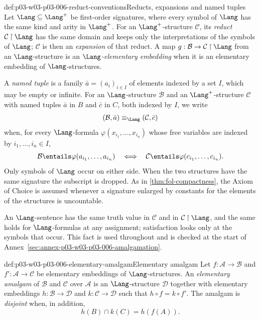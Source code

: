\begin{hbconvention}{def:p03-w03-p03-006-reduct-conventions}{Reducts, expansions and named tuples}
Let \(\Lang\subseteq\Lang^+\) be first-order signatures, where every symbol
of \(\Lang\) has the same kind and arity in \(\Lang^+\).  For an
\(\Lang^+\)-structure \(\mathcal C\), its \emph{reduct}
\(\mathcal C\mathbin{\upharpoonright}\Lang\) has the same domain and keeps
only the interpretations of the symbols of \(\Lang\); \(\mathcal C\) is then
an \emph{expansion} of that reduct.  A map
\(g:\mathcal B\to\mathcal C\mathbin{\upharpoonright}\Lang\) from an
\(\Lang\)-structure is an \emph{\(\Lang\)-elementary embedding} when it is
an elementary embedding of \(\Lang\)-structures.

A \emph{named tuple} is a family \(\bar a=(a_i)_{i\in I}\) of elements
indexed by a set \(I\), which may be empty or infinite.  For an
\(\Lang\)-structure \(\mathcal B\) and an \(\Lang^+\)-structure
\(\mathcal C\) with named tuples \(\bar a\) in \(B\) and \(\bar c\) in
\(C\), both indexed by \(I\), we write
\[
 (\mathcal B,\bar a)\equiv_{\Lang}(\mathcal C,\bar c)
\]
when, for every \(\Lang\)-formula \(\varphi(x_{i_1},\ldots,x_{i_n})\) whose
free variables are indexed by \(i_1,\ldots,i_n\in I\),
\[
 \mathcal B\entails\varphi(a_{i_1},\ldots,a_{i_n})
 \quad\Longleftrightarrow\quad
 \mathcal C\entails\varphi(c_{i_1},\ldots,c_{i_n}).
\]
Only symbols of \(\Lang\) occur on either side.  When the two structures
have the same signature the subscript is dropped.  As in
\cref{thm:fol-compactness}, the Axiom of Choice is assumed whenever a
signature enlarged by constants for the elements of the structures is
uncountable.
\end{hbconvention}

An \(\Lang\)-sentence has the same truth value in \(\mathcal C\) and in
\(\mathcal C\mathbin{\upharpoonright}\Lang\), and the same holds for
\(\Lang\)-formulas at any assignment; satisfaction looks only at the
symbols that occur.  This fact is used throughout and is checked at the
start of Annex~\ref{sec:annex-p03-w03-p03-006-amalgamation}.

\begin{hbdefinition}{def:p03-w03-p03-006-elementary-amalgam}{Elementary amalgam}
Let \(f:\mathcal A\to\mathcal B\) and \(f':\mathcal A\to\mathcal C\) be
elementary embeddings of \(\Lang\)-structures.  An \emph{elementary
amalgam} of \(\mathcal B\) and \(\mathcal C\) over \(\mathcal A\) is an
\(\Lang\)-structure \(\mathcal D\) together with elementary embeddings
\(h:\mathcal B\to\mathcal D\) and \(k:\mathcal C\to\mathcal D\) such that
\(h\circ f=k\circ f'\).  The amalgam is \emph{disjoint} when, in addition,
\[
 h(B)\cap k(C)=h(f(A)).
\]
\end{hbdefinition}

